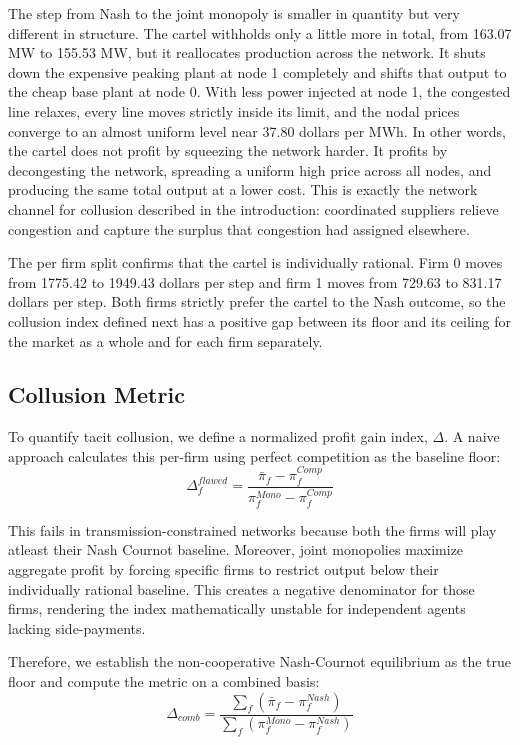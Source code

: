\documentclass[lettersize,journal]{IEEEtran}
\begin{document}
The step from Nash to the joint monopoly is smaller in quantity but very different in structure. The cartel withholds only a little more in total, from 163.07 MW to 155.53 MW, but it reallocates production across the network. It shuts down the expensive peaking plant at node 1 completely and shifts that output to the cheap base plant at node 0. With less power injected at node 1, the congested line relaxes, every line moves strictly inside its limit, and the nodal prices converge to an almost uniform level near 37.80 dollars per MWh. In other words, the cartel does not profit by squeezing the network harder. It profits by decongesting the network, spreading a uniform high price across all nodes, and producing the same total output at a lower cost. This is exactly the network channel for collusion described in the introduction: coordinated suppliers relieve congestion and capture the surplus that congestion had assigned elsewhere.

The per firm split confirms that the cartel is individually rational. Firm 0 moves from 1775.42 to 1949.43 dollars per step and firm 1 moves from 729.63 to 831.17 dollars per step. Both firms strictly prefer the cartel to the Nash outcome, so the collusion index defined next has a positive gap between its floor and its ceiling for the market as a whole and for each firm separately.

\subsection{Collusion Metric}

To quantify tacit collusion, we define a normalized profit gain index, $\Delta$. A naive approach calculates this per-firm using perfect competition as the baseline floor:
\begin{equation}
    \Delta_f^{flawed} = \frac{\bar{\pi}_f - \pi_f^{Comp}}{\pi_f^{Mono} - \pi_f^{Comp}}
\end{equation}

This fails in transmission-constrained networks because both the firms will play atleast their Nash Cournot baseline. Moreover, joint monopolies maximize aggregate profit by forcing specific firms to restrict output below their individually rational baseline. This creates a negative denominator for those firms, rendering the index mathematically unstable for independent agents lacking side-payments.

Therefore, we establish the non-cooperative Nash-Cournot equilibrium as the true floor and compute the metric on a combined basis:
\begin{equation}
    \Delta_{comb} = \frac{\sum_f (\bar{\pi}_f - \pi_f^{Nash})}{\sum_f (\pi_f^{Mono} - \pi_f^{Nash})}
\end{equation}
\end{document}
